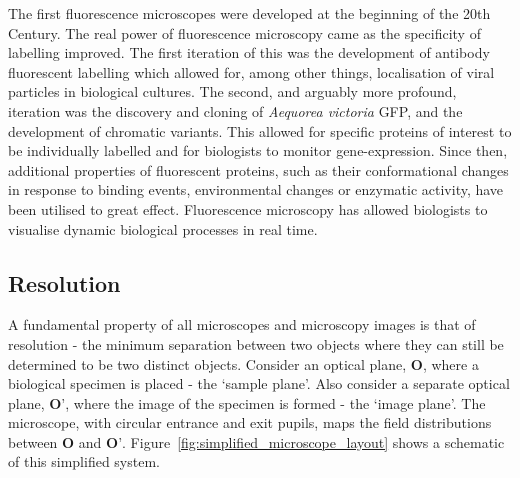 The first fluorescence microscopes were developed at the beginning of the 20th Century\cite{renz2013fluorescence,yuste2005fluorescence}. The real power of 
fluorescence microscopy came as the specificity of labelling improved. The 
first iteration of this was the development of antibody fluorescent labelling 
which allowed for, among other things, localisation of viral particles in 
biological 
cultures\cite{coons1942demonstration,coons1951fluorescent,weller1954fluorescent}.
The second, and arguably more profound, iteration was the discovery and 
cloning of \textit{Aequorea victoria} GFP, and the development of chromatic
variants\cite{prasher1992primary,heim1996engineering}. This allowed for 
specific proteins of interest to be individually labelled and for biologists 
to monitor gene-expression\cite{chalfie1994green}. Since then, additional 
properties of fluorescent proteins, such as their conformational changes 
in response to binding events, environmental changes or enzymatic activity, 
have been utilised to great effect\cite{toseland2013fluorescent}. 
Fluorescence microscopy has allowed biologists to visualise dynamic biological
processes in real time.

\subsection{Resolution}
\label{subsec:resolution}

A fundamental property of all microscopes and microscopy images is that of 
resolution - the minimum separation between two objects where they can still
be determined to be two distinct objects. Consider an optical plane, 
$\textbf{O}$, where a biological specimen is placed - the `sample plane'. Also
consider a separate optical plane, $\textbf{O'}$, where the image of the
specimen is formed - the `image plane'. The microscope, with circular entrance
and exit pupils, maps the field distributions between $\textbf{O}$ and 
$\textbf{O'}$. Figure~\ref{fig:simplified_microscope_layout} shows a schematic
of this simplified system.

